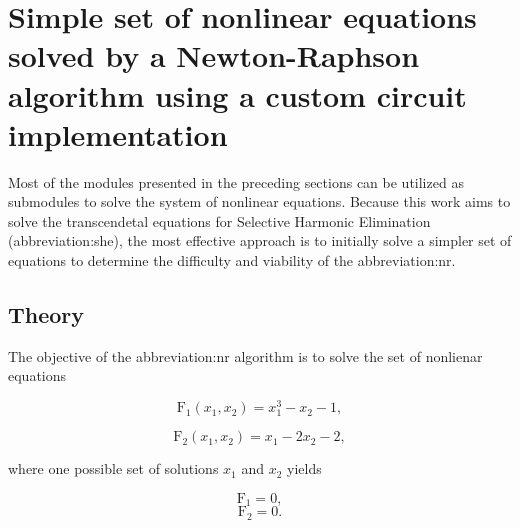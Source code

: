 \documentclass[a4paper, twoside, 11pt]{article}
\begin{document}
\section{Simple set of nonlinear equations solved by a Newton-Raphson algorithm using a custom circuit implementation}\label{sec:simple-set-of-nonlinear-equations-solved-by-a-newton-raphson-algorithm-using-custom-circuit-implementation}
    Most of the modules presented in the preceding sections can be utilized as submodules to solve the system of nonlinear equations. Because this work aims to solve the transcendetal equations for Selective Harmonic Elimination (\gls{abbreviation:she}), the most effective approach is to initially solve a simpler set of equations to determine the difficulty and viability of the \gls{abbreviation:nr}.
    \subsection{Theory}
        The objective of the \gls{abbreviation:nr} algorithm is to solve the set of nonlienar equations


        \begin{equation}
            \text{F}_1 (x_1, x_2) = x_1^3 - x_2 - 1, 
        \end{equation}

        \begin{equation}
            \text{F}_2 (x_1, x_2) = x_1 - 2 x_2 - 2, 
        \end{equation}

        where one possible set of solutions $x_1$ and $x_2$ yields

        \begin{equation}
            \text{F}_1 = 0, 
        \end{equation}
        \begin{equation}
            \text{F}_2 = 0.
        \end{equation}
\end{document}
